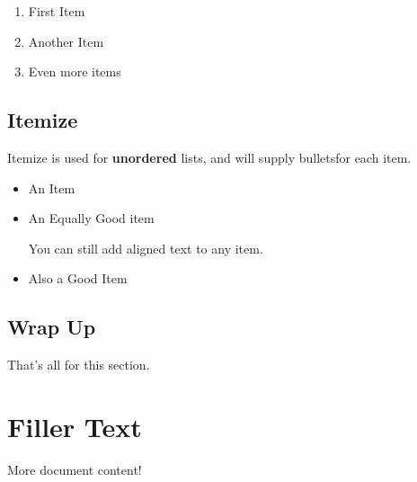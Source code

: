 \documentclass[11pt,letterpaper]{article}
\begin{document}
            \begin{enumerate}
              \item First Item
              \item Another Item
              \item Even more items
             
            \end{enumerate}
        
        \subsection{Itemize}
            Itemize is used for \textbf{unordered} lists, and will supply bulletsfor each item.
            
            \begin{itemize}
              \item An Item
              \item An Equally Good item
              
                You can still add aligned text to any item.
            
              \item Also a Good Item
              
            \end{itemize}
        
        
    
        \subsection{Wrap Up}
        That's all for this section.


\section{Filler Text}
More document content!
\end{document}
